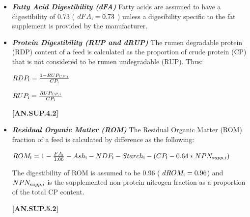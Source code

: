 \documentclass{article}
\begin{document}
\begin{refsection}
\begin{itemize}
\begin{itemize}
    \item \textbf{\textit{Fatty Acid Digestibility (dFA)} }
    \vspace{0.25cm}
   Fatty acids are assumed to have a digestibility of 0.73 ( \( dFA_{\text i} = 0.73\) ) unless a digesibility specific to the fat supplement is provided by the manufacturer. 
    \vspace{0.5cm}

    \item \textbf{\textit{Protein Digestibility (RUP and dRUP)} }
    \vspace{0.25cm}
   The rumen degradable protein (RDP) content of a feed is calculated as the proportion of crude protein (CP) that is not considered to be rumen undegradable (RUP). Thus: 
   
    \vspace{0.5cm}
    \begin{center}
    \(RDP_{\text i} = \frac{1 - RUP_{\text CP,i}}{CP_{\text i}} \)
    \end{center}
    \vspace{0.1cm}
    \begin{center}
    \(RUP_{\text i} = \frac{RUP_{\text CP,i}}{CP_{\text i}} \)
    \end{center}

    \vspace{0.5cm}
            {\raggedleft \textbf{[AN.SUP.4.2]}\par}
    \vspace{0.5cm}
    \item \textbf{\textit{Residual Organic Matter (ROM)} }
    \vspace{0.25cm}
    The Residual Organic Matter (ROM) fraction of a feed is calculated by difference as the following:
\begin{center}
    \(ROM_{\text i} = 1 - \frac{FA_{\text i}}{1.06} - Ash_{\text i} - NDF_{\text i} - Starch_{\text i} - (CP_{\text i} - 0.64*NPN_{\text supp, i}) \)
    \end{center}
\vspace{0.25cm}
The digestibility of ROM is assumed to be 0.96 ( \(dROM_{\text i} = 0.96\)) and \(NPN_{\text supp, i} \) is the supplemented non-protein nitrogen fraction as a proportion of the total CP content. 
    
    \vspace{0.5cm}
            {\raggedleft \textbf{[AN.SUP.5.2]}\par}
\end{itemize}
            \vspace{0.5cm}


\end{itemize}
\end{refsection}
\end{document}
